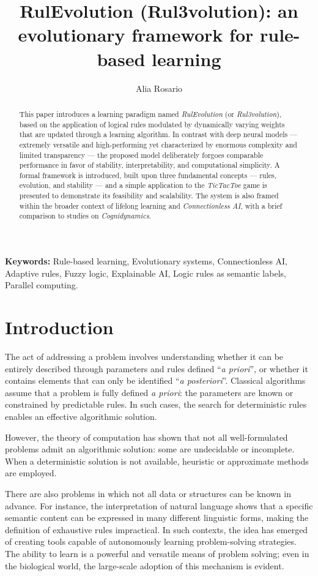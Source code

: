 \documentclass[12pt,a4paper]{article}
\title{\textbf{RulEvolution (Rul3volution): an evolutionary framework for rule-based learning}}
\author{Alia Rosario}
\date{}
\begin{document}
\sloppy

\maketitle

\begin{abstract}
This paper introduces a learning paradigm named \textit{RulEvolution} (or \textit{Rul3volution}), based on the application of logical rules modulated by dynamically varying weights that are updated through a learning algorithm. 
In contrast with deep neural models — extremely versatile and high-performing yet characterized by enormous complexity and limited transparency — the proposed model deliberately forgoes comparable performance in favor of stability, interpretability, and computational simplicity. 
A formal framework is introduced, built upon three fundamental concepts — rules, evolution, and stability — and a simple application to the \textit{TicTacToe} game is presented to demonstrate its feasibility and scalability. 
The system is also framed within the broader context of lifelong learning and \textit{Connectionless AI}, with a brief comparison to studies on \textit{Cognidynamics}.
\end{abstract}


\textbf{Keywords:} Rule-based learning, Evolutionary systems, Connectionless AI, Adaptive rules, Fuzzy logic, Explainable AI, Logic rules as semantic labels, Parallel computing.


\section{Introduction}
The act of addressing a problem involves understanding whether it can be entirely described through parameters and rules defined “\textit{a priori}”, or whether it contains elements that can only be identified “\textit{a posteriori}”.  
Classical algorithms assume that a problem is fully defined \textit{a priori}: the parameters are known or constrained by predictable rules.  
In such cases, the search for deterministic rules enables an effective algorithmic solution.  

However, the theory of computation has shown that not all well-formulated problems admit an algorithmic solution: some are undecidable or incomplete.  
When a deterministic solution is not available, heuristic or approximate methods are employed.  

There are also problems in which not all data or structures can be known in advance.  
For instance, the interpretation of natural language shows that a specific semantic content can be expressed in many different linguistic forms, making the definition of exhaustive rules impractical.  
In such contexts, the idea has emerged of creating tools capable of autonomously learning problem-solving strategies.  
The ability to learn is a powerful and versatile means of problem solving; even in the biological world, the large-scale adoption of this mechanism is evident.
\end{document}
